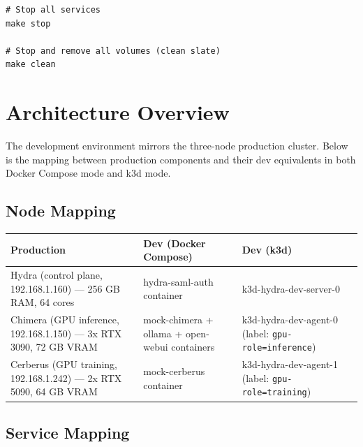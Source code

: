 \documentclass[11pt,a4paper]{article}
\begin{document}
\begin{lstlisting}[style=bash]
# Stop all services
make stop

# Stop and remove all volumes (clean slate)
make clean
\end{lstlisting}

\section{Architecture Overview}
\label{sec:architecture}

The development environment mirrors the three-node production cluster.
Below is the mapping between production components and their dev
equivalents in both Docker Compose mode and k3d mode.

\subsection{Node Mapping}

\begin{center}
\small
\begin{tabularx}{\textwidth}{l X X}
    \toprule
    \textbf{Production} & \textbf{Dev (Docker Compose)} & \textbf{Dev (k3d)} \\
    \midrule
    Hydra (control plane, 192.168.1.160) --- 256 GB RAM, 64 cores &
        hydra-saml-auth container &
        k3d-hydra-dev-server-0 \\
    \addlinespace
    Chimera (GPU inference, 192.168.1.150) --- 3x RTX 3090, 72 GB VRAM &
        mock-chimera + ollama + open-webui containers &
        k3d-hydra-dev-agent-0 (label: \texttt{gpu-role=inference}) \\
    \addlinespace
    Cerberus (GPU training, 192.168.1.242) --- 2x RTX 5090, 64 GB VRAM &
        mock-cerberus container &
        k3d-hydra-dev-agent-1 (label: \texttt{gpu-role=training}) \\
    \bottomrule
\end{tabularx}
\end{center}

\subsection{Service Mapping}
\end{document}
